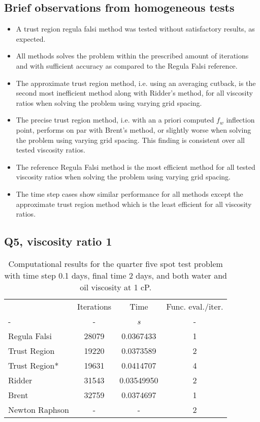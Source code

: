 \documentclass[a4paper,12pt]{report}
\begin{document}
\subsection{Brief observations from homogeneous tests}
 \begin{itemize}
  \item A trust region regula falsi method was tested without satisfactory results, as expected.
  \item All methods solves the problem within the prescribed amount of iterations and with sufficient accuracy as compared to the Regula Falsi reference.
  \item The approximate trust region method, i.e. using an averaging cutback, is the second most inefficient method along with Ridder's method, for all viscosity ratios when solving the problem using varying grid spacing.
  \item The precise trust region method, i.e. with an a priori computed $f_w$ inflection point, performs on par with Brent's method, or slightly worse when solving the problem using varying grid spacing. This finding is consistent over all tested viscosity ratios.
  \item The reference Regula Falsi method is the most efficient method for all tested viscosity ratios when solving the problem using varying grid spacing.
  \item The time step cases show similar performance for all methods except the approximate trust region method which is the least efficient for all viscosity ratios.
\end{itemize}

\subsection{Q5, viscosity ratio 1}
\begin{table}
\centering
\begin{tabular}{lccc}
\hline
 & Iterations & Time & Func. eval./iter. \\
- & - & \emph{s} & - \\ 
\hline
Regula Falsi & 28079 & 0.0367433 & 1 \\
Trust Region & 19220 & 0.0373589 & 2 \\
Trust Region* & 19631 & 0.0414707 & 4 \\
Ridder & 31543 & 0.03549950 & 2 \\
Brent & 32759 & 0.0374697 & 1 \\
Newton Raphson & - & - & 2 \\
\end{tabular}
\label{table:comp_results_fivequarterspot}
\caption{Computational results for the quarter five spot test problem with time step 0.1 days, final time 2 days, and both water and oil viscosity at 1 cP.}
\end{table}
\end{document}
